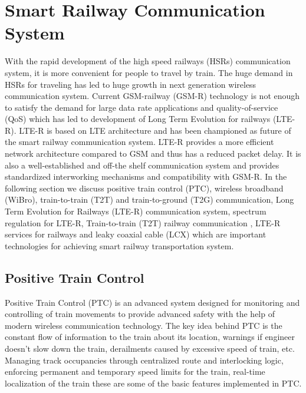 \chapter{Smart Railway Communication System}
\label{chapter2}

With the rapid development of the high speed railways (HSRs) communication system, it is more convenient for people to travel by train. The huge demand in HSRs for traveling has led to huge growth in next generation wireless communication system. Current GSM-railway (GSM-R) technology is not enough to satisfy the demand for large data rate applications and quality-of-service (QoS) which has led to development of Long Term Evolution for railways (LTE-R). LTE-R is based on LTE architecture and has been championed as future of the smart railway communication system. LTE-R provides a more efficient network architecture compared to GSM and thus has a reduced packet delay. It is also a well-established and off-the shelf communication system and provides standardized interworking mechanisms and compatibility with GSM-R. In the following section we discuss positive train control (PTC), wireless broadband (WiBro), train-to-train (T2T) and train-to-ground (T2G) communication, Long Term Evolution for Railways (LTE-R) communication system, spectrum regulation for LTE-R, Train-to-train (T2T) railway communication , LTE-R services for railways and leaky coaxial cable (LCX) which are important technologies for achieving smart railway transportation system.

\section{Positive Train Control}
Positive Train Control (PTC) is an advanced system designed for monitoring and controlling of train movements to provide advanced safety with the help of modern wireless communication technology. The key idea behind PTC is the constant flow of information to the train about its location, warnings if engineer doesn't slow down the train, derailments caused by excessive speed of train, etc. Managing track occupancies through centralized route and interlocking logic, enforcing permanent and temporary speed limits for the train, real-time localization of the train these are some of the basic features implemented in PTC. 

